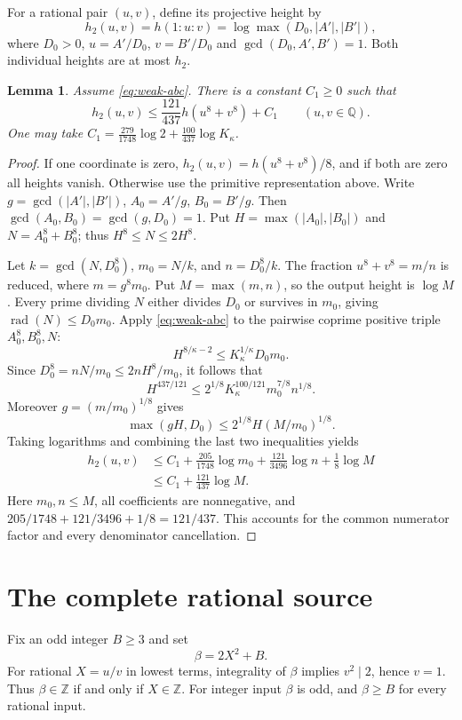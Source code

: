\documentclass[11pt,a4paper]{article}
\newtheorem{lemma}[theorem]{Lemma}
\newcommand{\Q}{\mathbb Q}\newcommand{\Z}{\mathbb Z}
\begin{document}
For a rational pair $(u,v)$, define its projective height by
\[
 h_2(u,v)=h(1:u:v)=\log\max(D_0,|A'|,|B'|),
\]
where $D_0>0$, $u=A'/D_0$, $v=B'/D_0$ and
$\gcd(D_0,A',B')=1$. Both individual heights are at most $h_2$.

\begin{lemma}\label{lem:eighth}
Assume \eqref{eq:weak-abc}. There is a constant $C_1\ge0$ such that
\[
              h_2(u,v)\le\frac{121}{437}h(u^8+v^8)+C_1
                   \qquad(u,v\in\Q).
\]
One may take
$C_1=\frac{279}{1748}\log2+\frac{100}{437}\log K_\kappa$.
\end{lemma}
\begin{proof}
If one coordinate is zero, $h_2(u,v)=h(u^8+v^8)/8$, and
if both are zero all heights vanish. Otherwise use the primitive
representation above. Write $g=\gcd(|A'|,|B'|)$,
$A_0=A'/g$, $B_0=B'/g$. Then
$\gcd(A_0,B_0)=\gcd(g,D_0)=1$.
Put $H=\max(|A_0|,|B_0|)$ and $N=A_0^8+B_0^8$;
thus $H^8\le N\le2H^8$.

Let $k=\gcd(N,D_0^8)$, $m_0=N/k$, and $n=D_0^8/k$.
The fraction $u^8+v^8=m/n$ is reduced, where $m=g^8m_0$.
Put $M=\max(m,n)$, so the output height is $\log M$.
Every prime dividing $N$ either divides $D_0$ or survives
in $m_0$, giving $\operatorname{rad}(N)\le D_0m_0$.
Apply \eqref{eq:weak-abc} to the pairwise coprime positive
triple $A_0^8,B_0^8,N$:
\[
                H^{8/\kappa-2}\le K_\kappa^{1/\kappa}D_0m_0.
\]
Since $D_0^8=nN/m_0\le2nH^8/m_0$, it follows that
\[
 H^{437/121}\le2^{1/8}K_\kappa^{100/121}m_0^{7/8}n^{1/8}.
\]
Moreover $g=(m/m_0)^{1/8}$ gives
\[
               \max(gH,D_0)\le2^{1/8}H(M/m_0)^{1/8}.
\]
Taking logarithms and combining the last two inequalities yields
\begin{align*}
 h_2(u,v)
 &\le C_1+\frac{205}{1748}\log m_0
                 +\frac{121}{3496}\log n+\frac18\log M\\
 &\le C_1+\frac{121}{437}\log M.
\end{align*}
Here $m_0,n\le M$, all coefficients are nonnegative, and
$205/1748+121/3496+1/8=121/437$. This accounts for the
common numerator factor and every denominator cancellation.
\end{proof}

\section{The complete rational source}

Fix an odd integer $B\ge3$ and set
\begin{equation}\label{eq:input}
                            \beta=2X^2+B.
\end{equation}
For rational $X=u/v$ in lowest terms, integrality of $\beta$
implies $v^2\mid2$, hence $v=1$. Thus $\beta\in\Z$ if and
only if $X\in\Z$. For integer input $\beta$ is odd, and
$\beta\ge B$ for every rational input.
\end{document}
